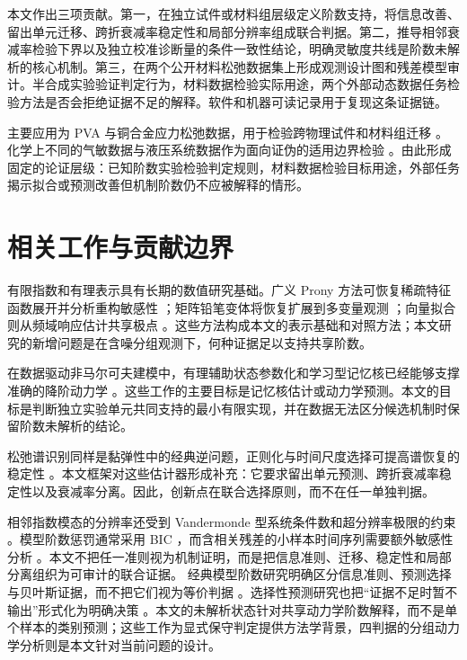 \documentclass[UTF8,11pt]{ctexart}
\begin{document}
本文作出三项贡献。第一，在独立试件或材料组层级定义阶数支持，将信息改善、留出单元迁移、跨折衰减率稳定性和局部分辨率组成联合判据。第二，推导相邻衰减率检验下界以及独立校准诊断量的条件一致性结论，明确灵敏度共线是阶数未解析的核心机制。第三，在两个公开材料松弛数据集上形成观测设计图和残差模型审计。半合成实验验证判定行为，材料数据检验实际用途，两个外部动态数据任务检验方法是否会拒绝证据不足的解释。软件和机器可读记录用于复现这条证据链。

主要应用为 PVA 与铜合金应力松弛数据，用于检验跨物理试件和材料组迁移 \cite{schelkow2026pva,kupferdigital2024relaxation}。化学上不同的气敏数据与液压系统数据作为面向证伪的适用边界检验 \cite{uci308gas,ziyatdinov2015dataset,ziyatdinov2015bioinspired,helwig2015hydraulic}。由此形成固定的论证层级：已知阶数实验检验判定规则，材料数据检验目标用途，外部任务揭示拟合或预测改善但机制阶数仍不应被解释的情形。

\section{相关工作与贡献边界}
有限指数和有理表示具有长期的数值研究基础。广义 Prony 方法可恢复稀疏特征函数展开并分析重构敏感性 \cite{stampfer2020gop}；矩阵铅笔变体将恢复扩展到多变量观测 \cite{bosner2021parallel}；向量拟合则从频域响应估计共享极点 \cite{gustavsen1999vector}。这些方法构成本文的表示基础和对照方法；本文研究的新增问题是在含噪分组观测下，何种证据足以支持共享阶数。

在数据驱动非马尔可夫建模中，有理辅助状态参数化和学习型记忆核已经能够支撑准确的降阶动力学 \cite{lei2016parameterization,ge2024state,lang2026learning}。这些工作的主要目标是记忆核估计或动力学预测。本文的目标是判断独立实验单元共同支持的最小有限实现，并在数据无法区分候选机制时保留阶数未解析的结论。

松弛谱识别同样是黏弹性中的经典逆问题，正则化与时间尺度选择可提高谱恢复的稳定性 \cite{stankiewicz2023relaxation}。本文框架对这些估计器形成补充：它要求留出单元预测、跨折衰减率稳定性以及衰减率分离。因此，创新点在联合选择原则，而不在任一单独判据。

相邻指数模态的分辨率还受到 Vandermonde 型系统条件数和超分辨率极限的约束 \cite{moitra2015superresolution}。模型阶数惩罚通常采用 BIC \cite{schwarz1978bic}，而含相关残差的小样本时间序列需要额外敏感性分析 \cite{hurvich1989timeseries}。本文不把任一准则视为机制证明，而是把信息准则、迁移、稳定性和局部分离组织为可审计的联合证据。
经典模型阶数研究明确区分信息准则、预测选择与贝叶斯证据，而不把它们视为等价判据 \cite{stoica2004modelorder,shao1993crossvalidation,kass1995bayes}。选择性预测研究也把“证据不足时暂不输出”形式化为明确决策 \cite{geifman2017selective}。本文的未解析状态针对共享动力学阶数解释，而不是单个样本的类别预测；这些工作为显式保守判定提供方法学背景，四判据的分组动力学分析则是本文针对当前问题的设计。
\end{document}
